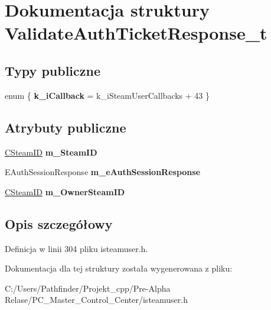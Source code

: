 \hypertarget{struct_validate_auth_ticket_response__t}{}\section{Dokumentacja struktury Validate\+Auth\+Ticket\+Response\+\_\+t}
\label{struct_validate_auth_ticket_response__t}
\subsection*{Typy publiczne}
\begin{DoxyCompactItemize}
\item 
\mbox{\label{struct_validate_auth_ticket_response__t_a3aeabbb58ec54f29c4ed3be9f08e97ba}} 
enum \{ {\bfseries k\+\_\+i\+Callback} = k\+\_\+i\+Steam\+User\+Callbacks + 43
 \}
\end{DoxyCompactItemize}
\subsection*{Atrybuty publiczne}
\begin{DoxyCompactItemize}
\item 
\mbox{\label{struct_validate_auth_ticket_response__t_a8d63ea7b8556bd1b821f52b8ea27de8a}} 
\hyperlink{class_c_steam_i_d}{C\+Steam\+ID} {\bfseries m\+\_\+\+Steam\+ID}
\item 
\mbox{\label{struct_validate_auth_ticket_response__t_a7b3290195fc99d5075bce745f5be3b1f}} 
E\+Auth\+Session\+Response {\bfseries m\+\_\+e\+Auth\+Session\+Response}
\item 
\mbox{\label{struct_validate_auth_ticket_response__t_a50e9ea2a6962d33f9e94024eea94b0a6}} 
\hyperlink{class_c_steam_i_d}{C\+Steam\+ID} {\bfseries m\+\_\+\+Owner\+Steam\+ID}
\end{DoxyCompactItemize}


\subsection{Opis szczegółowy}


Definicja w linii 304 pliku isteamuser.\+h.



Dokumentacja dla tej struktury została wygenerowana z pliku\+:\begin{DoxyCompactItemize}
\item 
C\+:/\+Users/\+Pathfinder/\+Projekt\+\_\+cpp/\+Pre-\/\+Alpha Relase/\+P\+C\+\_\+\+Master\+\_\+\+Control\+\_\+\+Center/isteamuser.\+h\end{DoxyCompactItemize}
